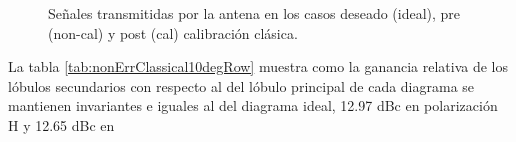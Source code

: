 \begin{figure}[H]
	\centering

	\caption{Señales transmitidas por la antena en los casos deseado (ideal), pre (non-cal) y post (cal) calibración clásica.}
	\label{fig:nonErrClassical10degRow}
\end{figure}
La tabla \ref{tab:nonErrClassical10degRow} muestra como la ganancia relativa de los lóbulos secundarios con respecto al del lóbulo
principal de cada diagrama se mantienen invariantes e iguales al del diagrama ideal, 12.97 dBc en polarización H y 12.65 dBc en
